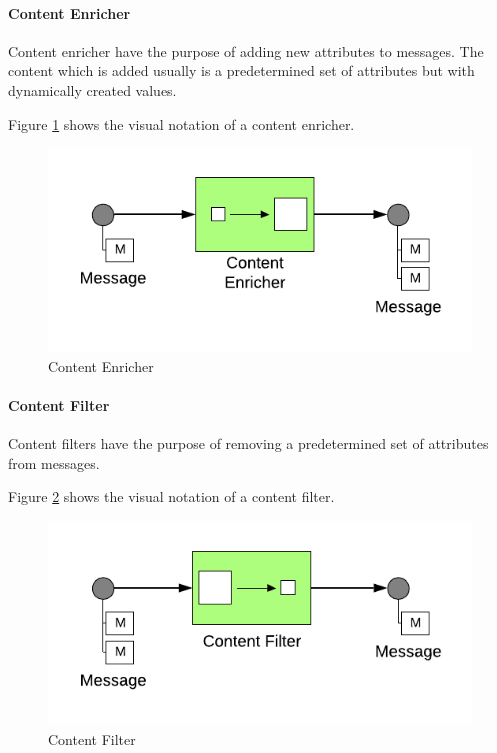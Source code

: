 \paragraph{Content Enricher}

Content enricher have the purpose of adding new attributes to messages. The content which is added usually is a predetermined set of attributes but with dynamically created values.

Figure \ref{messaging:enricher} shows the visual notation of a content enricher.


\begin{figure}[H]
    \centering
    \includegraphics[scale=0.6]{Diagrams/Messaging/10. Content Enricher.pdf}
    \caption{Content Enricher}
    \label{messaging:enricher}
\end{figure}

\paragraph{Content Filter}

Content filters have the purpose of removing a predetermined set of attributes from messages.

Figure \ref{messaging:filter3} shows the visual notation of a content filter.

\begin{figure}[H]
    \centering
    \includegraphics[scale=0.6]{Diagrams/Messaging/11. Content Filter.pdf}
    \caption{Content Filter}
    \label{messaging:filter3}
\end{figure}

